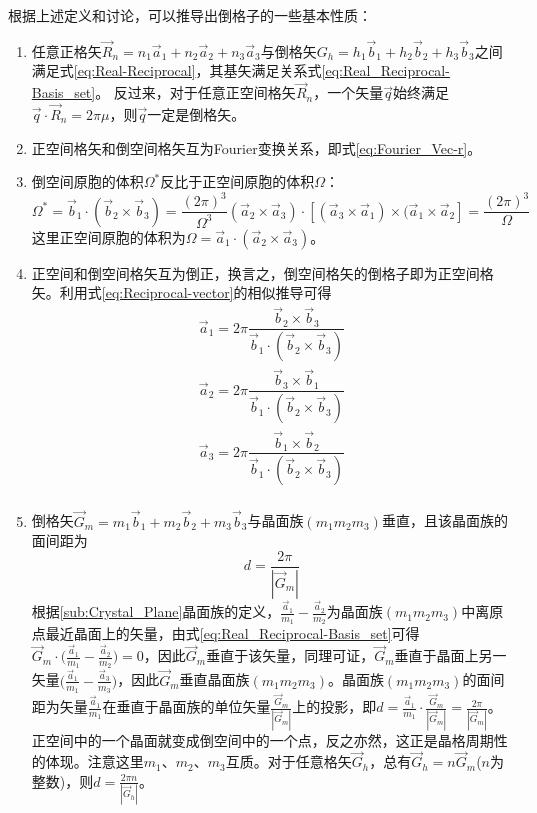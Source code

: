 根据上述定义和讨论，可以推导出倒格子的一些基本性质：
\begin{enumerate}
	\item 任意正格矢$\vec R_n=n_1\vec a_1+n_2\vec a_2+n_3\vec a_3$与倒格矢$G_h=h_1\vec b_1+h_2\vec b_2+h_3\vec b_3$之间满足式\eqref{eq:Real-Reciprocal}，其基矢满足关系式\eqref{eq:Real_Reciprocal-Basis_set}。 反过来，对于任意正空间格矢$\vec R_n$，一个矢量$\vec q$始终满足$\vec q\cdot\vec R_n=2\pi\mu$，则$\vec q$一定是倒格矢。 
	\item 正空间格矢和倒空间格矢互为Fourier变换关系，即式\eqref{eq:Fourier_Vec-r}。
	\item 倒空间原胞的体积$\Omega^{\ast}$反比于正空间原胞的体积$\Omega$：
\begin{displaymath}
	\Omega^{\ast}=\vec b_1\cdot(\vec b_2\times\vec b_3)=\dfrac{(2\pi)^3}{\Omega^3}(\vec a_2\times\vec a_3)\cdot[(\vec a_3\times\vec a_1)\times(\vec a_1\times\vec a_2]=\dfrac{(2\pi)^3}{\Omega}
\end{displaymath} 
这里正空间原胞的体积为$\Omega=\vec a_1\cdot(\vec a_2\times\vec a_3)$。

\item 正空间和倒空间格矢互为倒正，换言之，倒空间格矢的倒格子即为正空间格矢。利用式\eqref{eq:Reciprocal-vector}的相似推导可得
	\begin{displaymath}
		\begin{aligned}
			\vec a_1=2\pi\dfrac{\vec b_2\times\vec b_3}{\vec b_1\cdot(\vec b_2\times\vec b_3)}\\
			\vec a_2=2\pi\dfrac{\vec b_3\times\vec b_1}{\vec b_1\cdot(\vec b_2\times\vec b_3)}\\
			\vec a_3=2\pi\dfrac{\vec b_1\times\vec b_2}{\vec b_1\cdot(\vec b_2\times\vec b_3)}\\
		\end{aligned}
	\end{displaymath}
\item 倒格矢$\vec G_m=m_1\vec b_1+m_2\vec b_2+m_3\vec b_3$与晶面族$(m_1m_2m_3)$垂直，且该晶面族的面间距为
	\begin{equation}
		d=\dfrac{2\pi}{|\vec G_m|}
		\label{eq:Crystal_plane-displace}
	\end{equation} 
	根据\ref{sub:Crystal_Plane}晶面族的定义，$\frac{\vec a_1}{m_1}-\frac{\vec a_2}{m_2}$为晶面族$(m_1m_2m_3)$中离原点最近晶面上的矢量，由式\eqref{eq:Real_Reciprocal-Basis_set}可得$\vec G_m\cdot\big(\frac{\vec a_1}{m_1}-\frac{\vec a_2}{m_2}\big)=0$，因此$\vec G_m$垂直于该矢量，同理可证，$\vec G_m$垂直于晶面上另一矢量$\big(\frac{\vec a_1}{m_1}-\frac{\vec a_3}{m_3}\big)$，因此$\vec G_m$垂直晶面族$(m_1m_2m_3)$。晶面族$(m_1m_2m_3)$的面间距为矢量$\frac{\vec a_1}{m_1}$在垂直于晶面族的单位矢量$\frac{\vec G_m}{|\vec G_m|}$上的投影，即$d=\frac{\vec a_1}{m_1}\cdot\frac{\vec G_m}{|\vec G_m|}=\frac{2\pi}{|\vec G_m|}$。正空间中的一个晶面就变成倒空间中的一个点，反之亦然，这正是晶格周期性的体现。注意这里$m_1$、$m_2$、$m_3$互质。对于任意格矢$\vec G_h$，总有$\vec G_h=n\vec G_m$($n$为整数)，则$d=\frac{2\pi n}{|\vec G_h|}$。


\end{enumerate}
